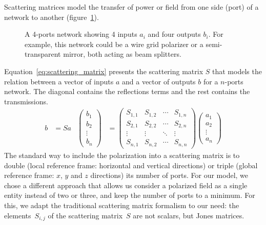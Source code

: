 \documentclass[journal]{IEEEtran}
\begin{document}
Scattering matrices \cite{siegman1986lasers} model the transfer of power or field from one side (port) of a network to another (figure~\ref{fig:ports}).

\begin{figure}
    \centering
    
    \caption{A 4-ports network showing 4 inputs $a_i$ and four outputs $b_i$.  For example, this network could be a wire grid polarizer or a semi-transparent mirror, both acting as beam splitters.}%
    \label{fig:ports}
\end{figure}

Equation~\ref{eq:scattering_matrix} presents the scattering matrix $S$ that models the relation between a vector of inputs $a$ and a vector of outputs $b$ for a $n$-ports network.
The diagonal contains the reflections terms and the rest contains the transmissions.
\begin{align}
    b &= S a
    &
    \begin{pmatrix}
        b_1\\
        b_2\\
        \vdots\\
        b_n
    \end{pmatrix}
    &=
    \begin{pmatrix}
        S_{1, 1} & S_{1, 2} & \cdots & S_{1, n} \\
        S_{2, 1} & S_{2, 2} & \cdots & S_{2, n} \\
        \vdots   & \vdots   & \ddots & \vdots   \\
        S_{n, 1} & S_{n, 2} & \cdots & S_{n, n}
    \end{pmatrix}
    \begin{pmatrix}
        a_1\\
        a_2\\
        \vdots\\
        a_n
    \end{pmatrix}
    \label{eq:scattering_matrix}
\end{align}
The standard way to include the polarization into a scattering matrix is to double (local reference frame: horizontal and vertical directions) or triple (global reference frame: $x$, $y$ and $z$ directions) its number of ports.
For our model, we chose a different approach that allows us consider a polarized field as a single entity instead of two or three, and keep the number of ports to a minimum.
For this, we adapt the traditional scattering matrix formalism to our need:
the elements~$S_{i, j}$ of the scattering matrix~$S$ are not scalars, but Jones matrices.
\end{document}
